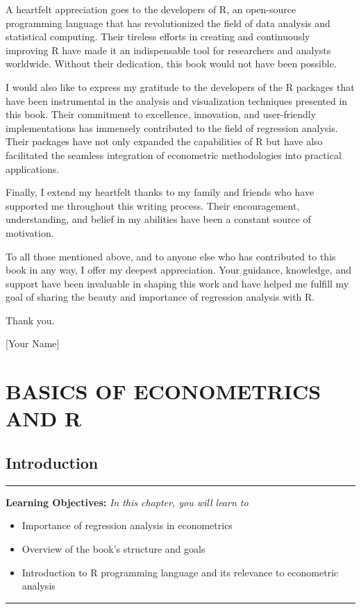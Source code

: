 \documentclass[
  letterpaper,
  twoside,
  openany]{scrbook}
\providecommand{\abstractname}{Learning Objectives} %
\newenvironment{objectives}[1]{%
	\hrule
	\vspace{5pt}
	\small\textbf{\abstractname: } 
	\newline
	\vspace{0.1cm}
	\small\emph{#1} %
	\itshape %
}{%
	\vspace{5pt}
	\hrule
	\vspace{0.6cm}
}
\begin{document}
A heartfelt appreciation goes to the developers of R, an open-source
programming language that has revolutionized the field of data analysis
and statistical computing. Their tireless efforts in creating and
continuously improving R have made it an indispensable tool for
researchers and analysts worldwide. Without their dedication, this book
would not have been possible.

I would also like to express my gratitude to the developers of the R
packages that have been instrumental in the analysis and visualization
techniques presented in this book. Their commitment to excellence,
innovation, and user-friendly implementations has immensely contributed
to the field of regression analysis. Their packages have not only
expanded the capabilities of R but have also facilitated the seamless
integration of econometric methodologies into practical applications.

Finally, I extend my heartfelt thanks to my family and friends who have
supported me throughout this writing process. Their encouragement,
understanding, and belief in my abilities have been a constant source of
motivation.

To all those mentioned above, and to anyone else who has contributed to
this book in any way, I offer my deepest appreciation. Your guidance,
knowledge, and support have been invaluable in shaping this work and
have helped me fulfill my goal of sharing the beauty and importance of
regression analysis with R.

Thank you.

{[}Your Name{]}

\part{BASICS OF ECONOMETRICS AND R}

\hypertarget{introduction}{%
\chapter{Introduction}\label{introduction}}

\begin{objectives}{In this chapter, you will learn to}
\begin{itemize}

\item{Importance of regression analysis in econometrics}

\item{Overview of the book's structure and goals}

\item{Introduction to R programming language and its relevance to econometric analysis}

\end{itemize}

\end{objectives}
\end{document}
